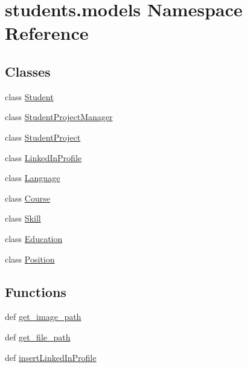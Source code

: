 \hypertarget{namespacestudents_1_1models}{\section{students.\-models Namespace Reference}
\label{namespacestudents_1_1models}
}
\subsection*{Classes}
\begin{DoxyCompactItemize}
\item 
class \hyperlink{classstudents_1_1models_1_1_student}{Student}
\item 
class \hyperlink{classstudents_1_1models_1_1_student_project_manager}{Student\-Project\-Manager}
\item 
class \hyperlink{classstudents_1_1models_1_1_student_project}{Student\-Project}
\item 
class \hyperlink{classstudents_1_1models_1_1_linked_in_profile}{Linked\-In\-Profile}
\item 
class \hyperlink{classstudents_1_1models_1_1_language}{Language}
\item 
class \hyperlink{classstudents_1_1models_1_1_course}{Course}
\item 
class \hyperlink{classstudents_1_1models_1_1_skill}{Skill}
\item 
class \hyperlink{classstudents_1_1models_1_1_education}{Education}
\item 
class \hyperlink{classstudents_1_1models_1_1_position}{Position}
\end{DoxyCompactItemize}
\subsection*{Functions}
\begin{DoxyCompactItemize}
\item 
def \hyperlink{namespacestudents_1_1models_aa9c9d7bfb7f8035d5302d6adbaa78be2}{get\-\_\-image\-\_\-path}
\item 
def \hyperlink{namespacestudents_1_1models_abcc46854fc7fca904e6449a9dbecb9c1}{get\-\_\-file\-\_\-path}
\item 
def \hyperlink{namespacestudents_1_1models_a069689ddea4de552ace8449569b9a997}{insert\-Linked\-In\-Profile}
\end{DoxyCompactItemize}


